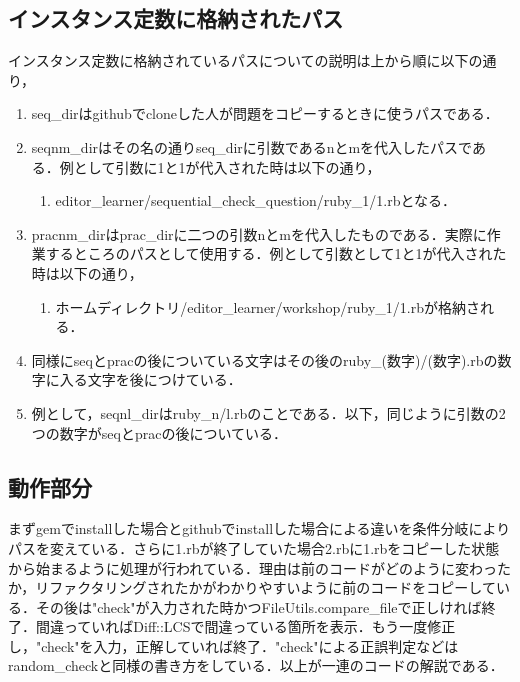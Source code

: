\subsection{インスタンス定数に格納されたパス}\label{ux30a4ux30f3ux30b9ux30bfux30f3ux30b9ux5b9aux6570ux306bux683cux7d0dux3055ux308cux305fux30d1ux30b9}

インスタンス定数に格納されているパスについての説明は上から順に以下の通り，

\begin{enumerate}
\def\labelenumi{\arabic{enumi}.}
\tightlist
\item
  seq\_dirはgithubでcloneした人が問題をコピーするときに使うパスである．
\item
  seqnm\_dirはその名の通りseq\_dirに引数であるnとmを代入したパスである．例として引数に1と1が代入された時は以下の通り，

  \begin{enumerate}
  \def\labelenumii{\arabic{enumii}.}
  \tightlist
  \item
    editor\_learner/sequential\_check\_question/ruby\_1/1.rbとなる．
  \end{enumerate}
\item
  pracnm\_dirはprac\_dirに二つの引数nとmを代入したものである．実際に作業するところのパスとして使用する．例として引数として1と1が代入された時は以下の通り，

  \begin{enumerate}
  \def\labelenumii{\arabic{enumii}.}
  \tightlist
  \item
    ホームディレクトリ/editor\_learner/workshop/ruby\_1/1.rbが格納される．
  \end{enumerate}
\item
  同様にseqとpracの後についている文字はその後のruby\_(数字)/(数字).rbの数字に入る文字を後につけている．
 \item
  例として，seqnl\_dirはruby\_n/l.rbのことである．以下，同じように引数の2つの数字がseqとpracの後についている．
\end{enumerate}

\subsection{動作部分}\label{ux52d5ux4f5cux90e8ux5206}

まずgemでinstallした場合とgithubでinstallした場合による違いを条件分岐によりパスを変えている．さらに1.rbが終了していた場合2.rbに1.rbをコピーした状態から始まるように処理が行われている．理由は前のコードがどのように変わったか，リファクタリングされたかがわかりやすいように前のコードをコピーしている．その後は"check"が入力された時かつFileUtils.compare\_fileで正しければ終了．間違っていればDiff::LCSで間違っている箇所を表示．もう一度修正し，"check"を入力，正解していれば終了．"check"による正誤判定などはrandom\_checkと同様の書き方をしている．以上が一連のコードの解説である．

